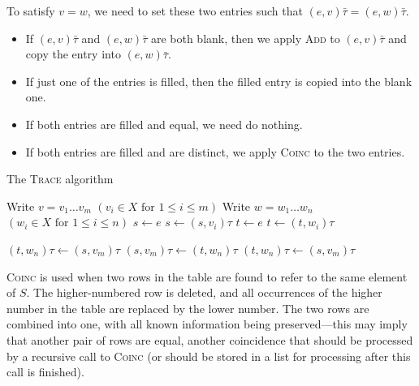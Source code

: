 To satisfy $v=w$, we need to set these two entries such that
$(e, v)\bar\tau = (e, w)\bar\tau$.
\begin{itemize}
\item If $(e, v)\bar\tau$ and $(e, w)\bar\tau$ are both blank, then we apply
  \textsc{Add} to $(e, v)\bar\tau$ and copy the entry into $(e, w)\bar\tau$.
\item If just one of the entries is filled, then the filled entry is copied into
  the blank one.
\item If both entries are filled and equal, we need do nothing.
\item If both entries are filled and are distinct, we apply \textsc{Coinc} to
  the two entries.
\end{itemize}

\begin{algorithm}
\caption{The \textsc{Trace} algorithm}
\label{alg:trace}
\begin{algorithmic}[1]
\State Write $v = v_1 \dots v_m$ \Comment $(v_i \in X \text{~for~} 1 \leq i \leq m)$
\State Write $w = w_1 \dots w_n$ \Comment $(w_i \in X \text{~for~} 1 \leq i \leq n)$
\State $s \gets e$
    \State {}
  \EndIf
  \State $s \gets (s, v_i)\tau$
\EndFor
\State $t \gets e$
    \State {}
  \EndIf
  \State $t \gets (t, w_i)\tau$
\EndFor

  \State {}
  \State $(t, w_n)\tau \gets (s, v_m)\tau$
  \State $(s, v_m)\tau \gets (t, w_n)\tau$
  \State $(t, w_n)\tau \gets (s, v_m)\tau$
  \State {}
\EndIf

\EndProcedure
\end{algorithmic}
\end{algorithm}

\textsc{Coinc} is used when two rows in the table are found to refer to the same
element of $S$.  The higher-numbered row is deleted, and all occurrences of the
higher number in the table are replaced by the lower number.  The two rows are
combined into one, with all known information being preserved---this may imply
that another pair of rows are equal, another coincidence that should be
processed by a recursive call to \textsc{Coinc} (or should be stored in a list
for processing after this call is finished).

